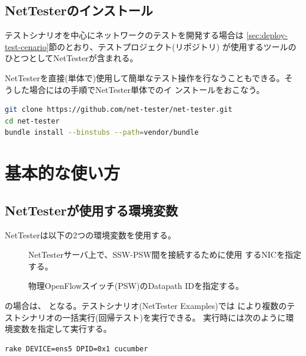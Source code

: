   \subsection{NetTesterのインストール}

テストシナリオを中心にネットワークのテストを開発する場合は
\ref{sec:deploy-test-cenario}節のとおり、テストプロジェクト(リポジトリ)
が使用するツールのひとつとしてNetTesterが含まれる。

NetTesterを直接(単体で)使用して簡単なテスト操作を行なうこともできる。そ
うした場合にはの手順でNetTester単体でのイ
ンストールをおこなう。

\begin{lstlisting}[language=sh,caption=NetTesterのインストール,label=lst:install-nettester]
git clone https://github.com/net-tester/net-tester.git
cd net-tester
bundle install --binstubs --path=vendor/bundle
\end{lstlisting}

 \section{基本的な使い方}
 \label{sec:basic-usage}

  \subsection{NetTesterが使用する環境変数}
  \label{sec:nettester-envvar}

NetTesterは以下の2つの環境変数を使用する。
\begin{description}
 \item[] NetTesterサーバ上で、SSW-PSW間を接続するために使用
            するNICを指定する。
 \item[] 物理OpenFlowスイッチ(PSW)のDatapath IDを指定する。
\end{description}

の場合は、
となる。テストシナリオ(NetTester Examples)では
により複数のテストシナリオの一括実行(回帰テスト)を実行できる。
実行時には次のように環境変数を指定して実行する。
\begin{lstlisting}
rake DEVICE=ens5 DPID=0x1 cucumber
\end{lstlisting}

